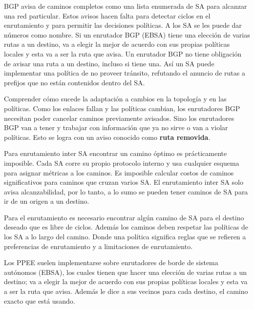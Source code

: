\documentclass[10pt,a4paper]{report}
\begin{document}
	\par BGP avisa de caminos completos como una lista enumerada de SA para alcanzar una red particular. Estos avisos hacen falta para detectar ciclos en el enrutamiento y para permitir las decisiones políticas. A los SA se les puede dar números como nombre.
Si un enrutador BGP (EBSA) tiene una elección de varias rutas a un destino, va a elegir la mejor de acuerdo con sus propias políticas locales y esta va a ser la ruta que avisa. Un enrutador BGP no tiene obligación de avisar una ruta a un destino, incluso si tiene una.
Así un SA puede implementar una política de no proveer tránsito, refutando el anuncio de rutas a prefijos que no están contenidos dentro del SA.

	\par Comprender cómo sucede la adaptación a cambios en la topología y en las políticas. Como los enlaces fallan y las políticas cambian, los enrutadores BGP necesitan poder cancelar caminos previamente avisados. Sino los enrutadores BGP van a tener y trabajar con información que ya no sirve o van a violar políticas. Esto se logra con un aviso conocido como \textbf{ruta removida}.

	\par Para enrutamiento inter SA encontrar un camino óptimo es prácticamente 	imposible. Cada SA corre su propio protocolo interno y usa cualquier esquema para 	asignar métricas a los caminos. Es imposible calcular costos de caminos significativos para caminos que cruzan varios SA. El enrutamiento inter SA solo avisa alcanzabilidad, por lo tanto, a lo sumo se pueden tener caminos de SA para ir de un origen a un destino.
	
	\par Para el enrutamiento es necesario encontrar algún camino de SA para el destino  deseado que es libre de ciclos. Además los caminos deben respetar las políticas de los SA a lo largo del camino. Donde una política significa reglas que se refieren a preferencias de enrutamiento y a limitaciones de enrutamiento.
   
	\par Los PPEE suelen implementarse sobre enrutadores de borde de sistema 
   autónomos (EBSA), los cuales tienen que hacer una elección de varias rutas a un 
   destino; va a elegir la mejor de acuerdo con sus propias políticas locales y esta va a 
   ser la ruta que avisa. Además le dice a sus vecinos para cada destino, el camino 
   exacto que está usando.
   	
\end{document}
